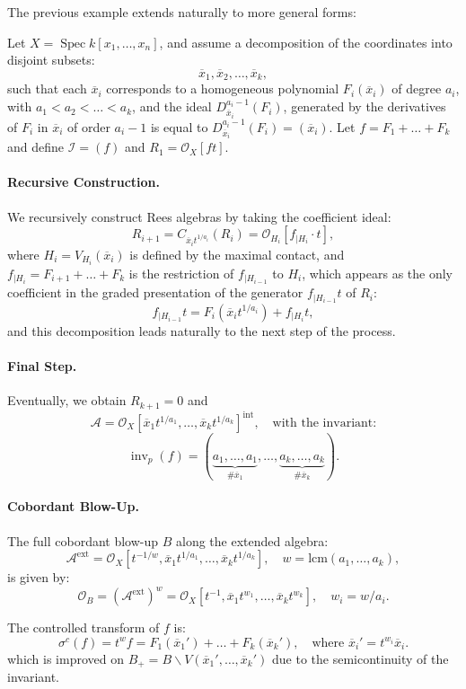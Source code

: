\documentclass{amsart}
\newcommand{\cA}{{\mathcal A}}
\newcommand{\cI}{{\mathcal I}}
\newcommand{\cO}{{\mathcal O}}
\newcommand{\ext}{{\operatorname{ext}}}
\newcommand{\Spec}{\operatorname{Spec}}
\renewcommand{\setminus}{\smallsetminus}
\newcommand{\inv}{{\operatorname{inv}}}
\begin{document}
The previous example extends naturally to more general forms:
\begin{example}
Let $X = \Spec k[x_1, \dots, x_n]$, and assume a decomposition of the coordinates into disjoint subsets:
\[
\overline{x}_1, \overline{x}_2, \dots, \overline{x}_k,
\]
such that each $\overline{x}_i$ corresponds to a homogeneous polynomial $F_i(\overline{x}_i)$ of degree $a_i$, with $a_1 < a_2 < \dots < a_k$, and
the ideal $D^{a_i - 1}_{\overline{x}_i}(F_i)$,
generated by the derivatives of $F_i$ in $\overline{x}_i$ of order $a_i-1$ is equal to $
D^{a_i - 1}_{\overline{x}_i}(F_i) = (\overline{x}_i).
$
Let $f = F_1 + \dots + F_k$ and define $\cI = (f)$ and $R_1 = \cO_X[f t]$.

\paragraph{\bf Recursive Construction.} 
We recursively construct Rees algebras by taking the coefficient ideal:
\[
R_{i+1} = C_{\overline{x}_i t^{1/a_i}}(R_i) = \cO_{H_i}\left[ f_{|H_i} \cdot t \right] ,
\]
where $H_i = V_{H_i}(\overline{x}_i)$ is defined by the  maximal contact, and $f_{|H_i} = F_{i+1} + \dots + F_k$ is the restriction of $f_{|H_{i-1}}$ to $H_i$, which appears as the only coefficient in the graded presentation of the generator $f_{|H_{i-1}} t$ of $R_i$:
\[
f_{|H_{i-1}} t = F_i(\overline{x}_i t^{1/a_i}) + f_{|H_i} t,
\]
and this decomposition leads naturally to the next step of the process.

\paragraph{\bf Final Step.} Eventually, we obtain $R_{k+1}=0$ and
\[
  \cA = \cO_X\left[ \overline{x}_1 t^{1/a_1}, \dots, \overline{x}_k t^{1/a_k} \right]^{\mathrm{int}},\quad \text{with the invariant:}
\]
\[
\inv_p(f) = (\underbrace{a_1, \dots, a_1}_{\#\overline{x}_1}, \dots, \underbrace{a_k, \dots, a_k}_{\#\overline{x}_k}).
\]

\paragraph{\bf Cobordant Blow-Up.} The full cobordant blow-up $B$ along the extended algebra:
\[
\cA^{\ext} = \cO_X\left[t^{-1/w}, \overline{x}_1 t^{1/a_1}, \dots, \overline{x}_k t^{1/a_k} \right], \quad w = \mathrm{lcm}(a_1, \dots, a_k),
\]
is given by:
\[
\cO_B = \left( \cA^{\ext} \right)^w = \cO_X\left[t^{-1}, \overline{x}_1 t^{w_1}, \dots, \overline{x}_k t^{w_k} \right], \quad w_i = w/a_i.
\]

The controlled transform of $f$ is:
\[
\sigma^c(f) = t^w f = F_1(\overline{x}_1') + \dots + F_k(\overline{x}_k'), \quad \text{where } \overline{x}_i' = t^{w_i} \overline{x}_i.
\]
which is improved on  $B_+ = B \setminus V(\overline{x}_1', \dots, \overline{x}_k')$ due to the semicontinuity of the invariant.

\end{example}
\end{document}

